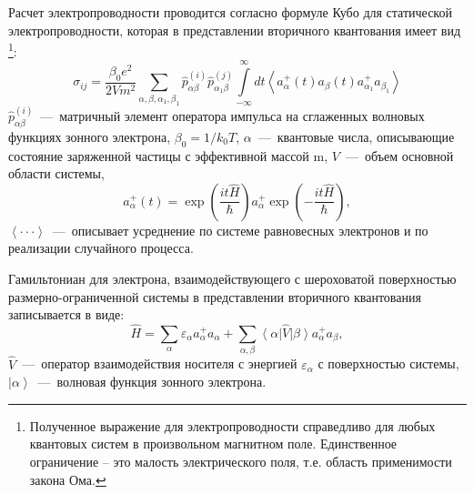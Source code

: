 Расчет электропроводности проводится согласно формуле Кубо \cite{Kubo1957a} для статической электропроводности, которая в представлении вторичного квантования имеет вид \footnote{ Полученное выражение для электропроводности справедливо для любых квантовых систем в произвольном магнитном поле. Единственное ограничение -- это малость электрического поля, т.е. область применимости закона Ома.}:
\begin{equation} \label{eq:31_10}
\sigma _{ij} =\frac{\beta_0 e^2 }{2 V m^2 } \sum _{\alpha,\beta, \alpha_1,\beta_1} \hat{p}_{\alpha \beta }^{(i)} \hat{p}_{\alpha_1 \beta }^{(j)} \int\limits_{-\infty }^{\infty} {dt\left\langle a_{\alpha }^+ (t) a_{\beta }(t) a_{\alpha_1 }^+ a_{\beta_1 } \right\rangle}
\end{equation} 
$\hat{p}_{\alpha \beta }^{(i)} $~---~матричный элемент оператора импульса на сглаженных волновых функциях зонного электрона, $\beta_0 = 1/k_0 T$, $\alpha $~---~квантовые числа, описывающие состояние заряженной частицы с эффективной массой m, $V$~---~объем основной области системы,
\[
a_{\alpha }^+ (t)= \exp\left(\frac{it\hat{H}}{\hbar } \right)a_{\alpha }^+ \exp\left(-\frac{it\hat{H}}{\hbar } \right),
\] 
$\left\langle \cdot \cdot \cdot \right\rangle $~---~описывает усреднение по системе равновесных электронов и по реализации случайного процесса.

Гамильтониан для электрона, взаимодействующего с шероховатой поверхностью размерно-ограниченной системы в представлении вторичного квантования записывается в виде:
\begin{equation} \label{eq:31_20}
\hat{H}=\sum _{\alpha }\varepsilon _{\alpha } a_{\alpha }^{+} a_{\alpha } +\sum _{\alpha ,\beta }{\left\langle \alpha  \right|} \hat{V}{\left| \beta  \right\rangle} a_{\alpha }^{+} a_{\beta }, 
\end{equation}
$\hat{V}$~---~оператор взаимодействия носителя с энергией $\varepsilon _{\alpha } $ с поверхностью системы, ${\left| \alpha  \right\rangle} $~---~волновая функция зонного электрона.

